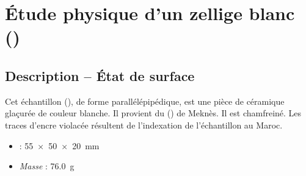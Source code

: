 
\chapter{Étude physique d'un zellige blanc ()}

\section{Description -- État de surface}

Cet échantillon (), de forme parallélépipédique, 
est une pièce de céramique glaçurée de couleur blanche. Il provient 
du \PaM () de Meknès. Il est chamfreiné. Les traces 
d'encre violacée résultent de l'indexation de l'échantillon au Maroc.

\begin{itemize}
  \item \DimText : \SI{55x50x20}{\mm}
  \item \emph{Masse} : \SI{76.0}{\g}
\end{itemize}


